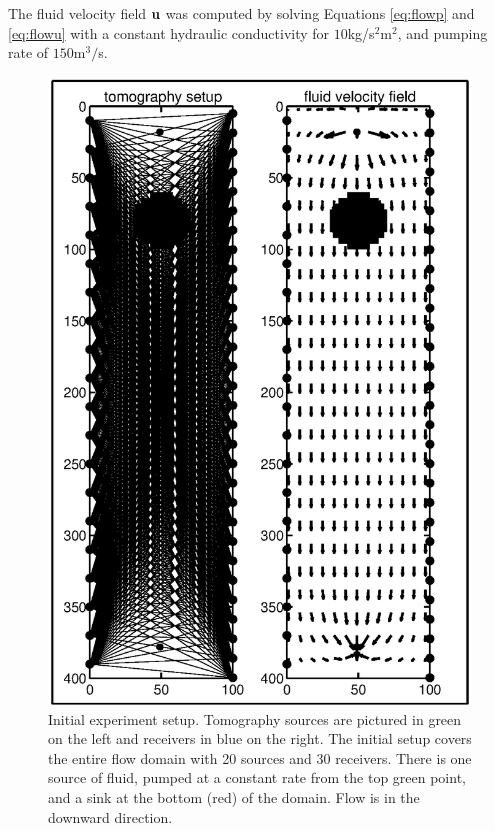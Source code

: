 \documentclass[final,leqno,onefignum,onetabnum]{siamltexmm}
\begin{document}
The  fluid velocity field ${\bf{u}}$ was  computed by solving Equations \eqref{eq:flowp} and \eqref{eq:flowu} with a constant hydraulic conductivity for  $10$kg/s$^2$m$^2$, and pumping rate of $150$m$^3/$s. 
\begin{figure}
	\renewcommand{\arraystretch}{1.5}
	\begin{center}
		\iwidth=90mm			
			\includegraphics[width=1\iwidth]{figures/initialFig/InitialSetup.eps}		
	\end{center}
\caption{Initial experiment setup. Tomography sources are pictured in green on the left and receivers in blue on the right. The initial setup covers the entire flow domain with 20 sources and 30 receivers. There is one source of fluid, pumped at a constant rate from the top green point, and a sink at the bottom (red) of the domain. Flow is in the downward direction. }
\label{fig:surveyDesign}
\end{figure}
\end{document}
